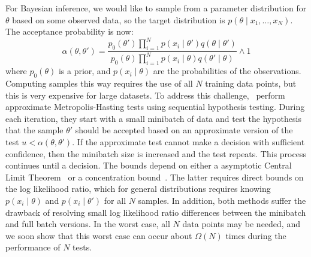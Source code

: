 \documentclass[twoside]{article} \usepackage{aistats2017}
\begin{document}
For Bayesian inference, we would like to sample from a parameter distribution
for $\theta$ based on some observed data, so the target distribution is
$p(\theta \mid x_1, \ldots, x_N)$. The acceptance probability is now:
\begin{equation}\label{eq:acceptance_probability}
    \alpha(\theta,\theta') = 
    \frac{p_0(\theta')\prod_{i=1}^N p(x_i \mid \theta')q(\theta \mid
    \theta')}{p_0(\theta)\prod_{i=1}^N p(x_i \mid \theta)q(\theta' \mid\theta)}
    \wedge 1
\end{equation}
where $p_0(\theta)$ is a prior, and $p(x_i \mid \theta)$ are the probabilities
of the observations. Computing samples this way requires the use of all $N$
training data points, but this is very expensive for large datasets. To address
this challenge,~\citet{cutting_mh_2014,icml2014c1_bardenet14} perform approximate
Metropolis-Hasting tests using sequential hypothesis testing. During each
iteration, they start with a small minibatch of data and test the hypothesis
that the sample $\theta'$ should be accepted based on an approximate version of
the test $u < \alpha(\theta,\theta')$. If the approximate test cannot make a
decision with sufficient confidence, then the minibatch size is increased and
the test repeats. This process continues until a decision. The bounds depend on
either a asymptotic Central Limit Theorem~\citep{cutting_mh_2014} or a
concentration bound~\citep{icml2014c1_bardenet14}. The latter requires direct
bounds on the log likelihood ratio, which for general distributions requires
knowing $p(x_i \mid \theta)$ and $p(x_i \mid \theta')$ for all $N$ samples. In
addition, both methods suffer the drawback of resolving small log likelihood
ratio differences between the minibatch and full batch versions.  In the worst
case, all $N$ data points may be needed, and we soon show that this worst case
can occur about $\Omega(N)$ times during the performance of $N$ tests.
\end{document}
